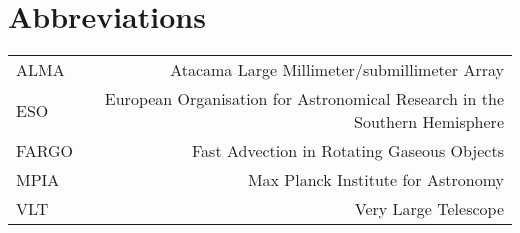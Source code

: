 
\section{Abbreviations}
  
  \begin{table}[h!]
    \begin{center}
      \begin{tabular}{l r}
        ALMA & Atacama Large Millimeter/submillimeter Array \\
        ESO & European Organisation for Astronomical Research in the 
          Southern Hemisphere \\
        FARGO & Fast Advection in Rotating Gaseous Objects \\
        MPIA & Max Planck Institute for Astronomy \\
        VLT & Very Large Telescope
      \end{tabular}
    \end{center}
  \end{table} \ \\ 

